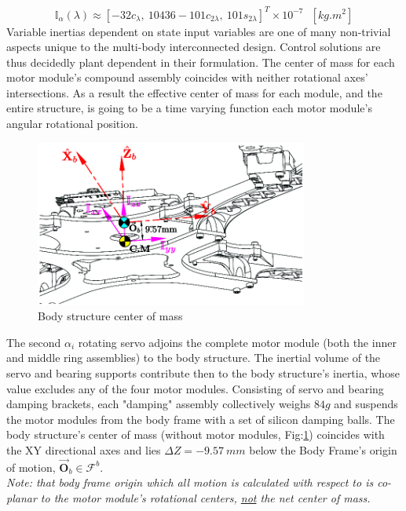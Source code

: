 \begin{equation}\label{eq:inertia.middle.vpa}
\mathbb{I}_\alpha(\lambda)\approx[-32{c}_{\lambda},~ 10436-101{c}_{2\lambda},~ 101{s}_{2\lambda}]^T\times10^{-7}~~~[kg.m^2]
\end{equation}
Variable inertias dependent on state input variables are one of many non-trivial aspects unique to the multi-body interconnected design. Control solutions are thus decidedly plant dependent in their formulation. The center of mass for each motor module's compound assembly coincides with neither rotational axes' intersections. As a result the effective center of mass for each module, and the entire structure, is going to be a time varying function each motor module's angular rotational position.
\begin{figure}[hbtp]
\centering
\includegraphics[width=0.8\textwidth]{figs/inertia-center}
\caption{Body structure center of mass}
\label{fig:inertia-center}
\end{figure}
\par
The second $\alpha_i$ rotating servo adjoins the complete motor module (both the inner and middle ring assemblies) to the body structure. The inertial volume of the servo and bearing supports contribute then to the body structure's inertia, whose value excludes any of the four motor modules. Consisting of servo and bearing damping brackets, each "damping" assembly collectively weighs $84g$ and suspends the motor modules from the body frame with a set of silicon damping balls. The body structure's center of mass (without motor modules, Fig:\ref{fig:inertia-center}) coincides with the XY directional axes and lies $\Delta Z=-9.57~mm$ below the Body Frame's origin of motion, $\vec{\mathbf{O}}_b\in\mathcal{F}^b$.
\\
\emph{\color{Gray}Note: that body frame origin which all motion is calculated with respect to is co-planar to the motor module's rotational centers, \underline{not} the net center of mass.}

